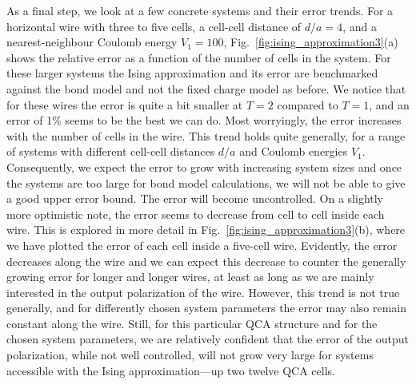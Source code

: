 As a final step, we look at a few concrete systems and their error trends. For a
horizontal wire with three to five cells, a cell-cell distance of $d/a = 4$, and
a nearest-neighbour Coulomb energy $V_1 = 100$,
Fig.~\ref{fig:ising_approximation3}(a) shows the relative error as a function of
the number of cells in the system. For these larger systems the Ising
approximation and its error are benchmarked against the bond model and not the
fixed charge model as before. We notice that for these wires the error is quite
a bit smaller at $T = 2$ compared to $T = 1$, and an error of 1\% seems to be
the best we can do. Most worryingly, the error increases with the number of
cells in the wire. This trend holds quite generally, for a range of systems with
different cell-cell distances $d/a$ and Coulomb energies $V_1$. Consequently, we
expect the error to grow with increasing system sizes and once the systems are
too large for bond model calculations, we will not be able to give a good upper
error bound. The error will become uncontrolled. On a slightly more optimistic
note, the error seems to decrease from cell to cell inside each wire. This is
explored in more detail in Fig.~\ref{fig:ising_approximation3}(b), where we have
plotted the error of each cell inside a five-cell wire. Evidently, the error
decreases along the wire and we can expect this decrease to counter the
generally growing error for longer and longer wires, at least as long as we are
mainly interested in the output polarization of the wire. However, this trend is
not true generally, and for differently chosen system parameters the error may
also remain constant along the wire. Still, for this particular QCA structure
and for the chosen system parameters, we are relatively confident that the error
of the output polarization, while not well controlled, will not grow very large
for systems accessible with the Ising approximation---up two twelve QCA cells. 
%
